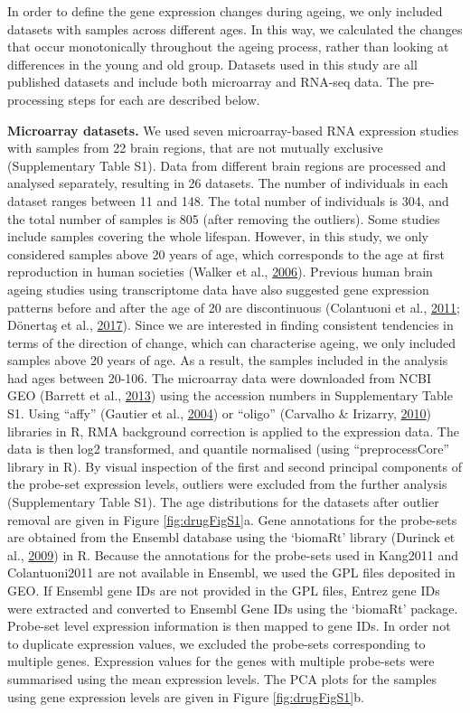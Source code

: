 \documentclass[12pt,twoside]{unicam}
\begin{document}
In order to define the gene expression changes during ageing, we only included datasets with samples across different ages. In this way, we calculated the changes that occur monotonically throughout the ageing process, rather than looking at differences in the young and old group. Datasets used in this study are all published datasets and include both microarray and RNA-seq data. The pre-processing steps for each are described below.

\textbf{Microarray datasets.} We used seven microarray-based RNA expression studies with samples from 22 brain regions, that are not mutually exclusive (Supplementary Table S1). Data from different brain regions are processed and analysed separately, resulting in 26 datasets. The number of individuals in each dataset ranges between 11 and 148. The total number of individuals is 304, and the total number of samples is 805 (after removing the outliers). Some studies include samples covering the whole lifespan. However, in this study, we only considered samples above 20 years of age, which corresponds to the age at first reproduction in human societies (Walker et al., \protect\hyperlink{ref-Walker2006}{2006}). Previous human brain ageing studies using transcriptome data have also suggested gene expression patterns before and after the age of 20 are discontinuous (Colantuoni et al., \protect\hyperlink{ref-Colantuoni2011}{2011}; Dönertaş et al., \protect\hyperlink{ref-Donertas2017}{2017}). Since we are interested in finding consistent tendencies in terms of the direction of change, which can characterise ageing, we only included samples above 20 years of age. As a result, the samples included in the analysis had ages between 20-106. The microarray data were downloaded from NCBI GEO (Barrett et al., \protect\hyperlink{ref-Barrett2013}{2013}) using the accession numbers in Supplementary Table S1. Using ``affy'' (Gautier et al., \protect\hyperlink{ref-Gautier2004}{2004}) or ``oligo'' (Carvalho \& Irizarry, \protect\hyperlink{ref-Carvalho2010}{2010}) libraries in R, RMA background correction is applied to the expression data. The data is then log2 transformed, and quantile normalised (using ``preprocessCore'' library in R). By visual inspection of the first and second principal components of the probe-set expression levels, outliers were excluded from the further analysis (Supplementary Table S1). The age distributions for the datasets after outlier removal are given in Figure \ref{fig:drugFigS1}a. Gene annotations for the probe-sets are obtained from the Ensembl database using the `biomaRt' library (Durinck et al., \protect\hyperlink{ref-Durinck2009}{2009}) in R. Because the annotations for the probe-sets used in Kang2011 and Colantuoni2011 are not available in Ensembl, we used the GPL files deposited in GEO. If Ensembl gene IDs are not provided in the GPL files, Entrez gene IDs were extracted and converted to Ensembl Gene IDs using the `biomaRt' package. Probe-set level expression information is then mapped to gene IDs. In order not to duplicate expression values, we excluded the probe-sets corresponding to multiple genes. Expression values for the genes with multiple probe-sets were summarised using the mean expression levels. The PCA plots for the samples using gene expression levels are given in Figure \ref{fig:drugFigS1}b.
\end{document}
